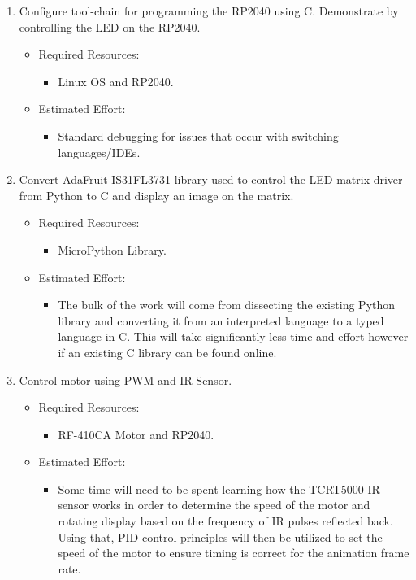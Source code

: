 \documentclass[11pt,journal]{IEEEtran}
\begin{document}
\begin{enumerate}
    \item Configure tool-chain for programming the RP2040 using C. Demonstrate by controlling the LED on the RP2040.
    \begin{itemize}
        \item Required Resources:
        \begin{itemize}
            \item Linux OS and RP2040.
        \end{itemize}
        \item Estimated Effort:
        \begin{itemize}
            \item Standard debugging for issues that occur with switching languages/IDEs.
        \end{itemize}
    \end{itemize}
    \item Convert AdaFruit IS31FL3731 library used to control the LED matrix driver from Python to C and display an image on the matrix.
    \begin{itemize}
        \item Required Resources:
        \begin{itemize}
            \item MicroPython Library.
        \end{itemize}
        \item Estimated Effort:
        \begin{itemize}
            \item The bulk of the work will come from dissecting the existing Python library and converting it from an interpreted language to a typed language in C. This will take significantly less time and effort however if an existing C library can be found online. 
        \end{itemize}
    \end{itemize}
    \item Control motor using PWM and IR Sensor.
    \begin{itemize}
        \item Required Resources:
        \begin{itemize}
            \item RF-410CA Motor and RP2040.
        \end{itemize}
        \item Estimated Effort:
        \begin{itemize}
            \item Some time will need to be spent learning how the TCRT5000 IR sensor works in order to determine the speed of the motor and rotating display based on the frequency of IR pulses reflected back. Using that, PID control principles will then be utilized to set the speed of the motor to ensure timing is correct for the animation frame rate.

\end{itemize}
\end{itemize}
\end{enumerate}
\end{document}
